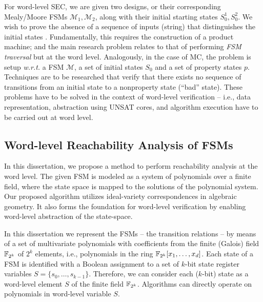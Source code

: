 For word-level SEC, we are given two designs, or their corresponding
Mealy/Moore FSMs ${\mathcal{M}}_1,{\mathcal{M}}_2$, along with their
initial starting states $S_0^1,S_0^2$. We wish to prove the absence of
a sequence of inputs (string) that distinguishes the initial
states \cite{coudert:iccad90,coudert1990verification}. Fundamentally, this requires 
the construction of a product machine; and the main research problem
relates to that of performing {\it FSM traversal} \cite{touati1990implicit}
but  at the word level. Analogously, in the case of MC, the problem
is setup {\it w.r.t.} a FSM $\mathcal{M}$, a set of initial states $S_0$ and
a set of property states $p$. Techniques are to be researched that
verify that there exists no sequence of transitions from an initial
state to a nonproperty state (``bad'' state). These problems have to
be solved in the context of word-level verification -- i.e., data
representation, abstraction using UNSAT cores, and
algorithm execution have to be carried out at word level.


\subsection{Word-level Reachability Analysis of FSMs}
In this dissertation, we propose a method to perform reachability analysis at the word level. 
	The given FSM is modeled as a system of polynomials over a finite field,
	where the state space is mapped to the solutions of the polynomial system.
	Our proposed algorithm utilizes ideal-variety correspondences in algebraic geometry.
	It also forms the foundation for word-level verification by enabling word-level abstraction of the
  state-space.

In this dissertation we represent
the FSMs -- the transition relations -- by means of a set of
multivariate polynomials with coefficients from the finite (Galois)
field ${\mathbb{F}}_{2^k}$ of $2^k$ elements, i.e., polynomials in the ring
${\mathbb{F}}_{2^k}[x_1,\dots,x_d]$. Each state of a FSM is identified with a
Boolean assignment to a set of $k$-bit state register variables
$S=\{s_0,\dots,s_{k-1}\}$. Therefore, we can consider each ($k$-bit)
state as a word-level element $S$ of the finite field
${\mathbb{F}}_{2^k}$. Algorithms can directly operate on polynomials in word-level
variable $S$. 

